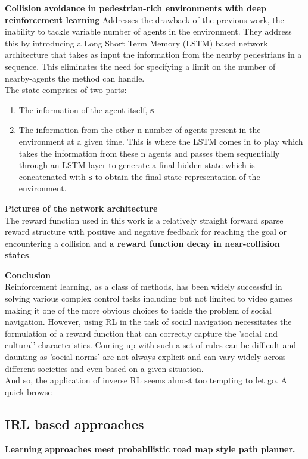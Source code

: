 \textbf{Collision avoidance in pedestrian-rich environments with deep reinforcement learning}
Addresses the drawback of the previous work, the inability to tackle variable number of agents in the environment. They address this by introducing a Long Short Term Memory (LSTM) based network architecture that takes as input the information from the nearby pedestrians in a sequence. This eliminates the need for specifying a limit on the number of nearby-agents the method can handle.\\
The state comprises of two parts: 
\begin{enumerate}
	\item The information of the agent itself, \textbf{s}
	\item The information from the other n number of agents present in the environment at a given time. This is where the LSTM comes in to play which takes the information from these n agents and passes them sequentially through an LSTM layer to generate a final hidden state which is concatenated with \textbf{s} to obtain the final state representation of the environment.
\end{enumerate}
\textbf{Pictures of the network architecture}
\\
The reward function used in this work is a relatively straight forward sparse reward structure with positive and negative feedback for reaching the goal or encountering a collision and \textbf{a reward function decay in near-collision states}.  

\textbf{Conclusion}\\
Reinforcement learning, as a class of methods, has been widely successful in solving various complex control tasks including but not limited to video games making it one of the more obvious choices to tackle the problem of social navigation. 
However, using RL in the task of social navigation necessitates the formulation of a reward function that can correctly capture the 'social and cultural' characteristics. Coming up with such a set of rules can be difficult and daunting as 'social norms' are not always explicit and can vary widely across different societies and even based on a given situation.\\

And so, the application of inverse RL seems almost too tempting to let go. A quick browse 
\subsection*{IRL based approaches}
\textbf{Learning approaches meet probabilistic road map style path planner.}

